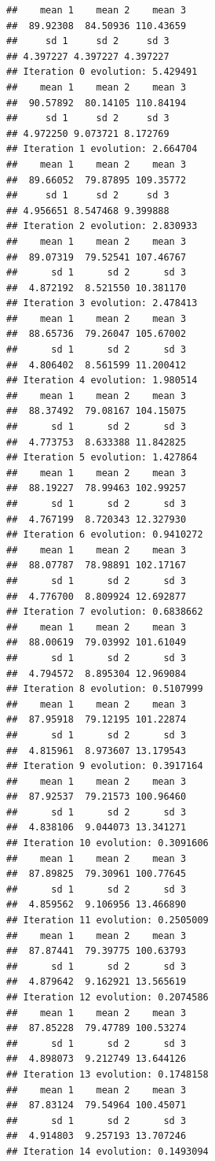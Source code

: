 \documentclass[
]{article}
\begin{document}
\begin{verbatim}
##    mean 1    mean 2    mean 3 
##  89.92308  84.50936 110.43659 
##     sd 1     sd 2     sd 3 
## 4.397227 4.397227 4.397227 
## Iteration 0 evolution: 5.429491 
##    mean 1    mean 2    mean 3 
##  90.57892  80.14105 110.84194 
##     sd 1     sd 2     sd 3 
## 4.972250 9.073721 8.172769 
## Iteration 1 evolution: 2.664704 
##    mean 1    mean 2    mean 3 
##  89.66052  79.87895 109.35772 
##     sd 1     sd 2     sd 3 
## 4.956651 8.547468 9.399888 
## Iteration 2 evolution: 2.830933 
##    mean 1    mean 2    mean 3 
##  89.07319  79.52541 107.46767 
##      sd 1      sd 2      sd 3 
##  4.872192  8.521550 10.381170 
## Iteration 3 evolution: 2.478413 
##    mean 1    mean 2    mean 3 
##  88.65736  79.26047 105.67002 
##      sd 1      sd 2      sd 3 
##  4.806402  8.561599 11.200412 
## Iteration 4 evolution: 1.980514 
##    mean 1    mean 2    mean 3 
##  88.37492  79.08167 104.15075 
##      sd 1      sd 2      sd 3 
##  4.773753  8.633388 11.842825 
## Iteration 5 evolution: 1.427864 
##    mean 1    mean 2    mean 3 
##  88.19227  78.99463 102.99257 
##      sd 1      sd 2      sd 3 
##  4.767199  8.720343 12.327930 
## Iteration 6 evolution: 0.9410272 
##    mean 1    mean 2    mean 3 
##  88.07787  78.98891 102.17167 
##      sd 1      sd 2      sd 3 
##  4.776700  8.809924 12.692877 
## Iteration 7 evolution: 0.6838662 
##    mean 1    mean 2    mean 3 
##  88.00619  79.03992 101.61049 
##      sd 1      sd 2      sd 3 
##  4.794572  8.895304 12.969084 
## Iteration 8 evolution: 0.5107999 
##    mean 1    mean 2    mean 3 
##  87.95918  79.12195 101.22874 
##      sd 1      sd 2      sd 3 
##  4.815961  8.973607 13.179543 
## Iteration 9 evolution: 0.3917164 
##    mean 1    mean 2    mean 3 
##  87.92537  79.21573 100.96460 
##      sd 1      sd 2      sd 3 
##  4.838106  9.044073 13.341271 
## Iteration 10 evolution: 0.3091606 
##    mean 1    mean 2    mean 3 
##  87.89825  79.30961 100.77645 
##      sd 1      sd 2      sd 3 
##  4.859562  9.106956 13.466890 
## Iteration 11 evolution: 0.2505009 
##    mean 1    mean 2    mean 3 
##  87.87441  79.39775 100.63793 
##      sd 1      sd 2      sd 3 
##  4.879642  9.162921 13.565619 
## Iteration 12 evolution: 0.2074586 
##    mean 1    mean 2    mean 3 
##  87.85228  79.47789 100.53274 
##      sd 1      sd 2      sd 3 
##  4.898073  9.212749 13.644126 
## Iteration 13 evolution: 0.1748158 
##    mean 1    mean 2    mean 3 
##  87.83124  79.54964 100.45071 
##      sd 1      sd 2      sd 3 
##  4.914803  9.257193 13.707246 
## Iteration 14 evolution: 0.1493094 

\end{verbatim}
\end{document}
